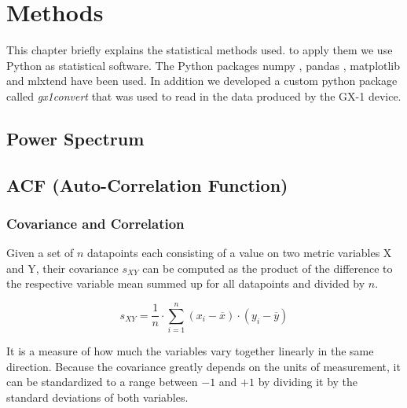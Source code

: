 \documentclass[12 pt]{scrartcl}
\begin{document}



\section{Methods}

This chapter briefly explains the statistical methods used. to apply them we use Python \citep{python} as statistical software. The Python packages numpy \citep{numpy}, pandas \citep{pandas}, matplotlib \citep{matplotlib} and mlxtend \citep{mlxtend} have been used. In addition we developed a custom python package called \emph{gx1convert} \citep{gx1convert} that was used to read in the data produced by the GX-1 device.


\subsection{Power Spectrum}


\subsection{ACF (Auto-Correlation Function)}


\subsubsection{Covariance and Correlation}

Given a set of $n$ datapoints each consisting of a value on two metric variables X and Y, their covariance $s_{XY}$ can be computed as the product of the difference to the respective variable mean summed up for all datapoints and divided by $n$.

\[ s_{XY} = \frac{1}{n} \cdot  \sum_{i=1}^{n}{(x_i - \overline{x}) \cdot (y_i - \overline{y})}\]

It is a measure of how much the variables vary together linearly in the same direction.
Because the covariance greatly depends on the units of measurement, it can be standardized to a range between $-1$ and $+1$ by dividing it by the standard deviations of both variables.
\end{document}

